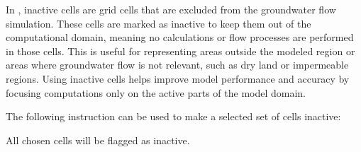 \label{section:InactiveCells}
In \mfus, inactive cells are grid cells that are excluded from the groundwater flow simulation. These cells are marked as inactive to keep them out of the computational domain, meaning no calculations or flow processes are performed in those cells. This is useful for representing areas outside the modeled region or areas where groundwater flow is not relevant, such as dry land or impermeable regions. Using inactive cells helps improve model performance and accuracy by focusing computations only on the active parts of the model domain.

The following instruction can be used to make a selected set of cells inactive:

    {All chosen cells will be flagged as inactive.
    }
